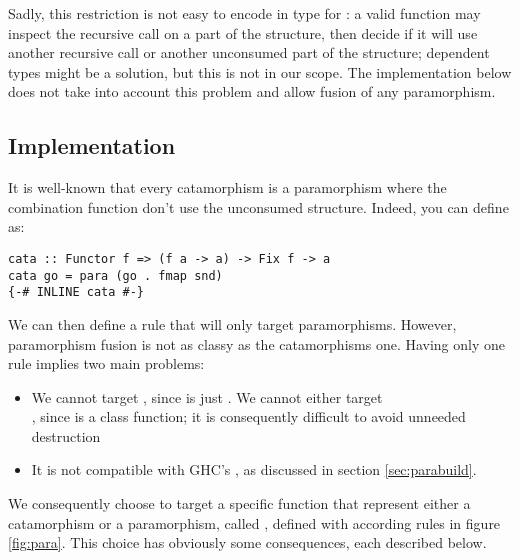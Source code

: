 Sadly, this restriction is not easy to encode in type for : a valid function may inspect the recursive call on a part of the structure, then decide if it will use another recursive call or another unconsumed part of the structure; dependent types might be a solution, but this is not in our scope. The implementation below does not take into account this problem and allow fusion of any paramorphism.

\subsection{Implementation}
\label{sec:para-impl}

It is well-known that every catamorphism is a paramorphism where the combination function don't use the unconsumed structure. Indeed, you can define  as:
\begin{verbatim}
cata :: Functor f => (f a -> a) -> Fix f -> a
cata go = para (go . fmap snd)
{-# INLINE cata #-}
\end{verbatim}

\noindent We can then define a rule that will only target paramorphisms. However, paramorphism fusion is not as classy as the catamorphisms one. Having only one rule implies two main problems:
\begin{itemize}
\item We cannot target , since  is just . We cannot either target\\ , since  is a class function; it is consequently difficult to avoid unneeded destruction %

\item It is not compatible with GHC's , as discussed in section \ref{sec:parabuild}.
\end{itemize}

We consequently choose to target a specific function that represent either a catamorphism or a paramorphism, called , defined with according rules in figure \ref{fig:para}.
This choice has obviously some consequences, each described below.

